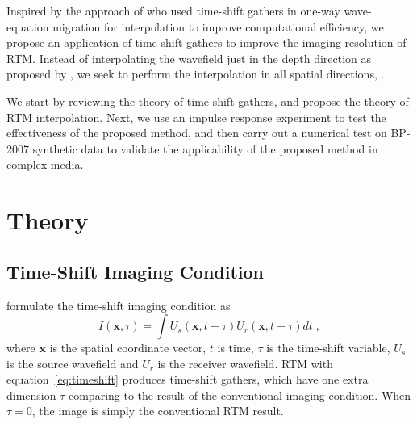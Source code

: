 Inspired by the approach of \cite{ng07gp} who used time-shift gathers in one-way wave-equation migration for interpolation to improve computational efficiency,
we propose an application of time-shift gathers to improve the imaging resolution of RTM.
Instead of interpolating the wavefield just in the depth direction as proposed by \cite{ng07gp}, 
we seek to perform the interpolation in all spatial directions, .

We start by reviewing the theory of time-shift gathers, and propose the theory of RTM interpolation.
Next, we use an impulse response experiment to test the effectiveness of the proposed method, 
and then carry out a numerical test on BP-2007 synthetic data to validate the applicability of the proposed method in complex media.

\section{Theory}

\subsection{Time-Shift Imaging Condition}

\cite{sava06} formulate the time-shift imaging condition as
\begin{equation}
I(\mathbf{x},\tau) = \int U_s(\mathbf{x},t+\tau) U_r(\mathbf{x},t-\tau) dt \; ,
\label{eq:timeshift}
\end{equation}
where $\mathbf{x}$ is the spatial coordinate vector, $t$ is time, $\tau$ is the time-shift variable, $U_s$ is the source wavefield
and $U_r$ is the receiver wavefield.
RTM with equation~\ref{eq:timeshift} produces time-shift gathers, which have one extra dimension $\tau$ 
comparing to the result of the conventional imaging condition. 
When $\tau=0$, the image is simply the conventional RTM result. 

